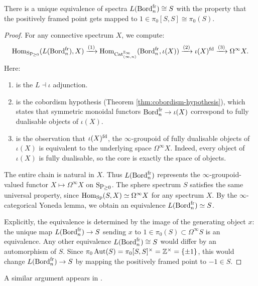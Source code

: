 \documentclass{amsart}
\begin{document}
\begin{proposition}\label{prop:L-S}
    There is a unique equivalence of spectra $L(\operatorname{Bord}^{\mathrm{fr}}_n) \cong S$ with the property that the positively framed point gets mapped to $1 \in \pi_0 [S,S] \cong \pi_0(S)$.
\end{proposition}
\begin{proof} 
For any connective spectrum $X$, we compute:
\begin{equation}
\label{eq:invcobhyp}
\operatorname{Hom}_{\operatorname{Sp}_{\ge 0}}(L(\operatorname{Bord}_n^{\mathrm{fr}}), X) \xrightarrow{(1)} \operatorname{Hom}_{\operatorname{Cat}_{(\infty,n)}^{\mathbb{E}_\infty}}(\operatorname{Bord}_n^{\mathrm{fr}}, \iota(X)) \xrightarrow{(2)} \iota(X)^{\mathrm{fd}} \xrightarrow{(3)} \Omega^\infty X.
\end{equation}
Here:
\begin{enumerate}
    \item[$\natural_1$] is the $L\dashv \iota$ adjunction.
    \item[$\natural_2$] is the cobordism hypothesis (Theorem \ref{thm:cobordism-hypothesis}), which states that symmetric monoidal functors $\operatorname{Bord}_n^{\mathrm{fr}} \to \iota(X)$ correspond to fully dualisable objects of $\iota(X)$.
    \item[$\natural_3$] is the observation that $\iota(X)^{\mathrm{fd}}$, the $\infty$-groupoid of fully dualisable objects of $\iota(X)$ is equivalent to the underlying space $\Omega^\infty X$. Indeed, every object of $\iota(X)$ is fully dualisable, so the core is exactly the space of objects.
\end{enumerate}
The entire chain is natural in $X$. Thus $L(\operatorname{Bord}_n^{\mathrm{fr}})$ represents the $\infty$-groupoid-valued functor $X \mapsto \Omega^\infty X$ on $\operatorname{Sp}_{\ge 0}$. The sphere spectrum $S$ satisfies the same universal property, since $\operatorname{Hom}_{\operatorname{Sp}}(S, X) \simeq \Omega^\infty X$ for any spectrum $X$. By the $\infty$-categorical Yoneda lemma, we obtain an equivalence $L(\operatorname{Bord}_n^{\mathrm{fr}}) \simeq S$.

Explicitly, the equivalence is determined by the image of the generating object $x$: the unique map $L(\operatorname{Bord}_n^{\mathrm{fr}}) \to S$ sending $x$ to $1 \in \pi_0(S) \subset \Omega^\infty S$ is an equivalence.
Any other equivalence $L(\operatorname{Bord}_n^{\mathrm{fr}}) \cong S$ would differ by an automorphism of $S$.
Since $\pi_0 \operatorname{Aut}(S) = \pi_0 [S,S]^\times = \mathbb{Z}^\times = \{\pm 1\}$, this would change $L(\operatorname{Bord}_n^{\mathrm{fr}}) \to S$ by mapping the positively framed point to $-1 \in S$.
\end{proof}

\begin{remark}
    A similar argument appears in \cite[Section 7]{MR2994995}.
\end{remark}
\end{document}

